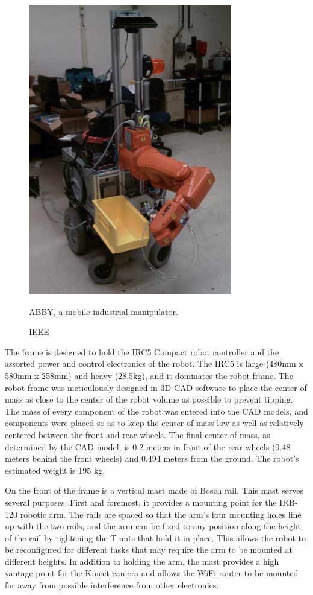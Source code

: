 \documentclass[]{cwru} %
\begin{document}
\begin{figure}[ht]
\centering
\includegraphics[height=5.0in]{abby_2_edited}
\caption{ABBY, a mobile industrial manipulator.}
\caption*{ IEEE \cite{venator_case}}
\label{fig:abby-photo}
\end{figure}

The frame is designed to hold the IRC5 Compact robot controller and the
assorted power and control electronics of the robot. The IRC5 is large
(480mm x 580mm x 258mm) and heavy (28.5kg), and it dominates the robot
frame. The robot frame was meticulously designed in 3D CAD software to
place the center of mass as close to the center of the robot volume as
possible to prevent tipping. The mass of every component of the robot
was entered into the CAD models, and components were placed so as to
keep the center of mass low as well as relatively centered between the
front and rear wheels. The final center of mass, as determined by the
CAD model, is 0.2 meters in front of the rear wheels (0.48 meters behind
the front wheels) and 0.494 meters from the ground. The robot's
estimated weight is 195 kg.

On the front of the frame is a vertical mast made of Bosch rail. This
mast serves several purposes. First and foremost, it provides a mounting
point for the IRB-120 robotic arm. The rails are spaced so that the
arm's four mounting holes line up with the two rails, and the arm can be
fixed to any position along the height of the rail by tightening the T
nuts that hold it in place. This allows the robot to be reconfigured for
different tasks that may require the arm to be mounted at different
heights. In addition to holding the arm, the mast provides a high
vantage point for the Kinect camera and allows the WiFi router to be
mounted far away from possible interference from other electronics.
\end{document}
